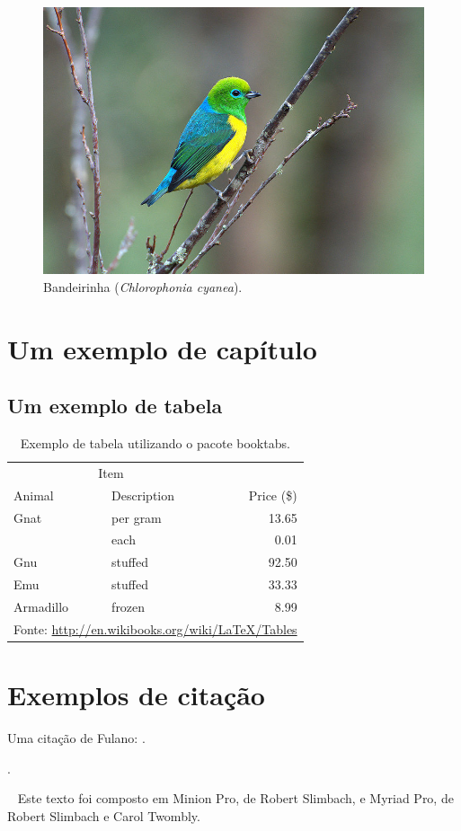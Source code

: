 \documentclass[11pt,a5paper]{memoir}
\begin{document}
\begin{figure}
\centering
\includegraphics[width=0.6\linewidth]{bandeirinha}
\caption{Bandeirinha (\textit{Chlorophonia cyanea}).}
\label{fig:bandeirinha}
\end{figure}




\chapter{Um exemplo de capítulo}
\section{Um exemplo de tabela}
\begin{table}
\caption{Exemplo de tabela utilizando o pacote \textsf{booktabs}.}
\begin{tabular}{llr}
\toprule
\multicolumn{2}{c}{Item} \\
\cmidrule(r){1-2}
Animal    & Description & Price (\$) \\
\midrule
Gnat      & per gram    & 13.65      \\
          & each        & 0.01       \\
Gnu       & stuffed     & 92.50      \\
Emu       & stuffed     & 33.33      \\
Armadillo & frozen      & 8.99       \\
\bottomrule
\multicolumn{3}{l}{\footnotesize Fonte: \url{http://en.wikibooks.org/wiki/LaTeX/Tables}}
\end{tabular}
\end{table}

\chapter{Exemplos de citação}

Uma citação de Fulano: .

\cite{fulano}.



\backmatter %
\cleardoublepage
\thispagestyle{empty} %
~\vfill
Este texto foi composto em Minion Pro, de Robert Slimbach, e Myriad Pro, de Robert Slimbach e Carol Twombly.
\end{document}

